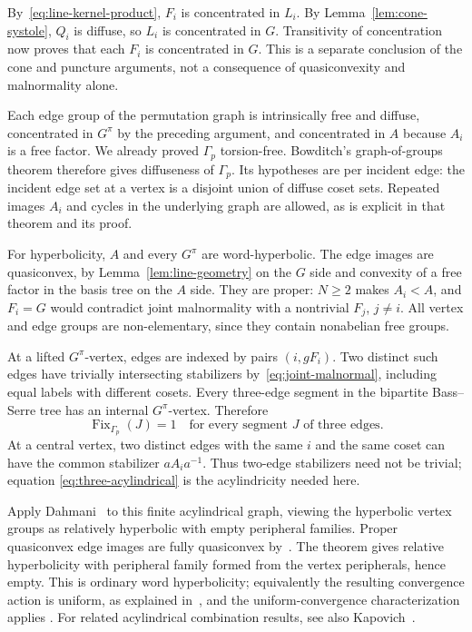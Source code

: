 By~\eqref{eq:line-kernel-product}, \(F_i\) is concentrated in \(L_i\).
By Lemma~\ref{lem:cone-systole}, \(Q_i\) is diffuse, so \(L_i\) is
concentrated in \(G\). Transitivity of concentration
\cite[Theorem~1.3(1)]{Bowditch} now proves that each \(F_i\) is
concentrated in \(G\). This is a separate conclusion of the cone
and puncture arguments, not a consequence of quasiconvexity and
malnormality alone.

Each edge group of the permutation graph is intrinsically free and
diffuse, concentrated in \(G^\pi\) by the preceding argument, and
concentrated in \(A\) because \(A_i\) is a free factor. We already
proved \(\Gamma_p\) torsion-free. Bowditch's graph-of-groups theorem
\cite[Theorem~1.3(2)]{Bowditch} therefore gives diffuseness of
\(\Gamma_p\). Its hypotheses are per incident edge: the incident
edge set at a vertex is a disjoint union of diffuse coset sets.
Repeated images \(A_i\) and cycles in the underlying graph are
allowed, as is explicit in that theorem and its proof.

For hyperbolicity, \(A\) and every \(G^\pi\) are word-hyperbolic.
The edge images are quasiconvex, by Lemma~\ref{lem:line-geometry} on
the \(G\) side and convexity of a free factor in the basis tree on
the \(A\) side. They are proper: \(N\ge2\) makes \(A_i<A\), and
\(F_i=G\) would contradict joint malnormality with a nontrivial
\(F_j\), \(j\ne i\). All vertex and edge groups are non-elementary,
since they contain nonabelian free groups.

At a lifted \(G^\pi\)-vertex, edges are indexed by pairs
\((i,gF_i)\). Two distinct such edges have trivially intersecting
stabilizers by~\eqref{eq:joint-malnormal}, including equal labels
with different cosets. Every three-edge segment in the bipartite
Bass--Serre tree has an internal \(G^\pi\)-vertex. Therefore
\begin{equation}\label{eq:three-acylindrical}
 \operatorname{Fix}_{\Gamma_p}(J)=1
 \quad\text{for every segment \(J\) of three edges}.
\end{equation}
At a central vertex, two distinct edges with the same \(i\) and the
same coset can have the common stabilizer \(aA_i a^{-1}\).
Thus two-edge stabilizers need not be trivial; equation
\eqref{eq:three-acylindrical} is the acylindricity needed here.

Apply Dahmani~\cite[Theorem~0.1(1), p.~935]{Dahmani} to this finite
acylindrical graph, viewing the hyperbolic vertex groups as relatively
hyperbolic with empty peripheral families. Proper quasiconvex edge
images are fully quasiconvex by~\cite[Proposition~1.11, p.~942]{Dahmani}.
The theorem gives relative hyperbolicity with peripheral family formed
from the vertex peripherals, hence empty. This is ordinary word
hyperbolicity; equivalently the resulting convergence action is
uniform, as explained in~\cite[p.~934]{Dahmani}, and the
uniform-convergence characterization applies
\cite[Theorem~0.1]{BowditchTop}. For related acylindrical combination results, see also
Kapovich~\cite{Kapovich}.

